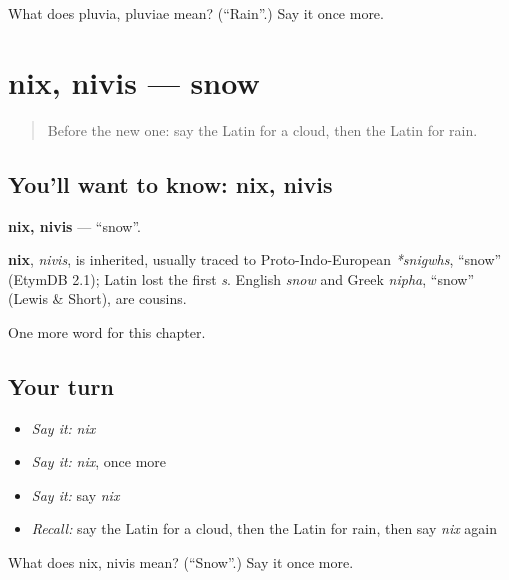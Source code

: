 \begin{tcolorbox}[breakable,colback=teal!4,colframe=teal!35!black,title={Before you move on}]
What does pluvia, pluviae mean? (\textquotedblleft{}Rain\textquotedblright{}.) Say it once more.
\end{tcolorbox}
\section[nix, nivis]{nix, nivis — snow}

\label{lesson:LA-C89-nix}



\begin{quote}
Before the new one: say the Latin for a cloud, then the Latin for rain.
\end{quote}

\subsection*{You'll want to know: nix, nivis}
\textbf{nix, nivis} — \textquotedblleft{}snow\textquotedblright{}.

\begin{cousinweb}
\textbf{nix}, \emph{nivis}, is inherited, usually traced to Proto-Indo-European \emph{*snigwhs}, \textquotedblleft{}snow\textquotedblright{} (EtymDB 2.1); Latin lost the first \emph{s}. English \emph{snow} and Greek \emph{nipha}, \textquotedblleft{}snow\textquotedblright{} (Lewis \& Short), are cousins.
\end{cousinweb}

\begin{grammarlens}[title={What you've built}]
One more word for this chapter.
\end{grammarlens}

\subsection*{Your turn}
\begin{itemize}
\raggedright
  \item \emph{Say it:} \emph{nix}
  \item \emph{Say it:} \emph{nix}, once more
  \item \emph{Say it:} say \emph{nix}
  \item \emph{Recall:} say the Latin for a cloud, then the Latin for rain, then say \emph{nix} again
\end{itemize}

\begin{tcolorbox}[breakable,colback=teal!4,colframe=teal!35!black,title={Before you move on}]
What does nix, nivis mean? (\textquotedblleft{}Snow\textquotedblright{}.) Say it once more.
\end{tcolorbox}

